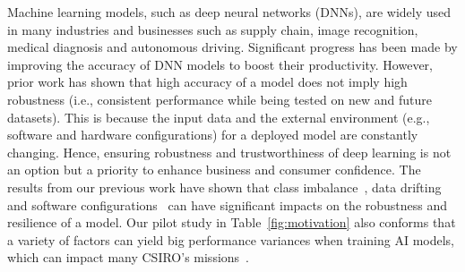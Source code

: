 
 




Machine learning models, such as deep neural networks (DNNs), are widely used in many industries and businesses such as supply chain, image  recognition, medical diagnosis and autonomous driving. Significant progress has been made by improving the accuracy of DNN models to boost their productivity. 
However, prior work has shown that high accuracy of a model does not imply high robustness (i.e., consistent performance while being tested on new and future datasets). This is because the input data and the external environment (e.g., software and hardware configurations) for a deployed model are constantly changing. 
Hence, ensuring robustness and trustworthiness of deep learning is not an option but a priority to enhance business and consumer confidence.
The results from our previous work have shown that class imbalance~\cite{shumsr22}, data drifting~\cite{majumder2022methods} and software configurations~\cite{xiao2021nondeterministic} can have significant impacts on the robustness and resilience of a model. Our pilot study in Table~\ref{fig:motivation} also conforms that a variety of factors can yield big performance variances when training AI models, which can  impact many CSIRO's missions~\cite{csiromission}.


